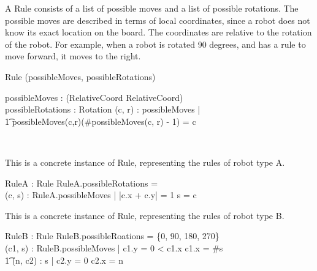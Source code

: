 \documentclass[12pt]{article}
\begin{document}
A Rule consists of a list of possible moves and a list of possible rotations. The possible moves are described in terms of local coordinates, since a robot does not know its exact location on the board. The coordinates are relative to the rotation of the robot. For example, when a robot is rotated 90 degrees, and has a rule to move forward, it moves to the right.
\begin{class}{Rule}
\upharpoonright (possibleMoves, possibleRotations) \\
\begin{state}
possibleMoves : \power (RelativeCoord \pfun \seq RelativeCoord) \\
possibleRotations : \power Rotation
\where
\forall (c, r) : \dom possibleMoves | \\ \t1 possibleMoves(c,r)(\#possibleMoves(c, r) - 1) = c
\end{state} \\
\end{class}
This is a concrete instance of Rule, representing the rules of robot type A.
\begin{axdef}
RuleA : Rule
\where
RuleA.possibleRotations = \emptyset \\
\forall (c, s) : RuleA.possibleMoves | |c.x + c.y| = 1 \wedge s = \langle c\rangle
\end{axdef}
This is a concrete instance of Rule, representing the rules of robot type B.
\begin{axdef}
RuleB : Rule
\where
RuleB.possibleRoations = \{0, 90, 180, 270\} \\
\forall (c1, s) : RuleB.possibleMoves | c1.y = 0  < c1.x  \wedge c1.x = \#s \; \; \wedge \\ \t1 \forall (n, c2) : s | c2.y = 0 \wedge c2.x = n
\end{axdef}
\end{document}
